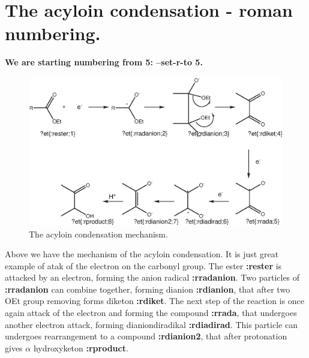 \documentclass[a4paper,12pt,final]{article}
\newcommand{\nrzw}[1]{{\Huge{\textbf{#1}}}}
\begin{document}
\section{The acyloin condensation - roman numbering.}
\begin{center}
\textbf{We are starting numbering from 5: --set-r-to 5.}
\end{center}
\begin{figure}[htp]
\includegraphics[width=1\textwidth]{reaction_roman.eps}
\caption{The acyloin condensation mechanism.}
\end{figure}
Above we have the mechanism of the acyloin condensation. It is just great example of atak of the electron on the carbonyl group. The ester
 \nrzw{:rester} is attacked by an electron, forming the anion radical \nrzw{:rradanion}. Two particles of \nrzw{:rradanion} can combine together,
  forming dianion \nrzw{:rdianion}, that after two OEt group removing forms diketon \nrzw{:rdiket}. The next step of the reaction is once again attack of
   the electron and forming the compound \nrzw{:rrada}, that undergoes another electron attack, forming dianiondiradikal \nrzw{:rdiadirad}. This
    particle can undergoes rearrangement to a compound \nrzw{:rdianion2}, that after protonation gives $\alpha$ hydroxyketon \nrzw{:rproduct}.

    \newpage
\end{document}
